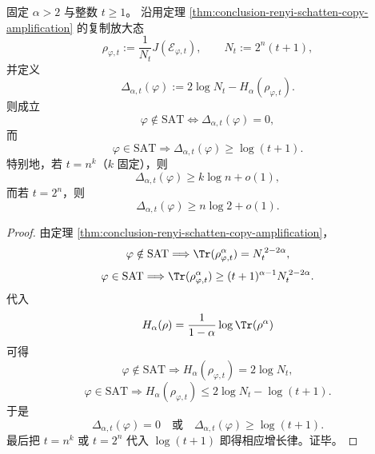 \begin{theorem}\label{thm:conclusion-renyi-schatten-gap-copy-amplified-order-parameter}
固定 \(\alpha>2\) 与整数 \(t\ge 1\)。
沿用定理 \ref{thm:conclusion-renyi-schatten-copy-amplification} 的复制放大态
\[
\rho_{\varphi,t}:=\frac{1}{N_t}J(\mathcal E_{\varphi,t}),
\qquad
N_t:=2^n(t+1),
\]
并定义
\[
\Delta_{\alpha,t}(\varphi):=2\log N_t-H_\alpha(\rho_{\varphi,t}).
\]
则成立
\[
\varphi\notin \mathrm{SAT}
\iff
\Delta_{\alpha,t}(\varphi)=0,
\]
而
\[
\varphi\in \mathrm{SAT}
\Longrightarrow
\Delta_{\alpha,t}(\varphi)\ge \log(t+1).
\]
特别地，若 \(t=n^k\)（\(k\) 固定），则
\[
\Delta_{\alpha,t}(\varphi)\ge k\log n+o(1),
\]
而若 \(t=2^n\)，则
\[
\Delta_{\alpha,t}(\varphi)\ge n\log 2+o(1).
\]
\end{theorem}
\begin{proof}
由定理 \ref{thm:conclusion-renyi-schatten-copy-amplification}，
\[
\varphi\notin \mathrm{SAT}
\Longrightarrow
\Tr(\rho_{\varphi,t}^\alpha)=N_t^{\,2-2\alpha},
\]
\[
\varphi\in \mathrm{SAT}
\Longrightarrow
\Tr(\rho_{\varphi,t}^\alpha)\ge (t+1)^{\alpha-1}N_t^{\,2-2\alpha}.
\]
代入
\[
H_\alpha(\rho)=\frac{1}{1-\alpha}\log\Tr(\rho^\alpha)
\]
可得
\[
\varphi\notin \mathrm{SAT}
\Longrightarrow
H_\alpha(\rho_{\varphi,t})=2\log N_t,
\]
\[
\varphi\in \mathrm{SAT}
\Longrightarrow
H_\alpha(\rho_{\varphi,t})\le 2\log N_t-\log(t+1).
\]
于是
\[
\Delta_{\alpha,t}(\varphi)=0
\quad\text{或}\quad
\Delta_{\alpha,t}(\varphi)\ge \log(t+1).
\]
最后把 \(t=n^k\) 或 \(t=2^n\) 代入 \(\log(t+1)\) 即得相应增长律。证毕。
\end{proof}

